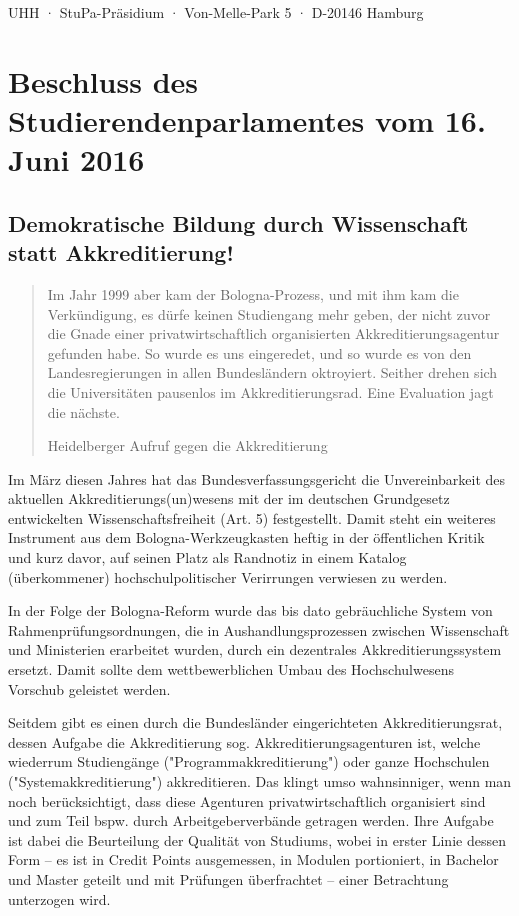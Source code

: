 \documentclass[ngerman,headheight=70pt]{scrartcl}
\begin{document}
    UHH · StuPa-Präsidium · Von-Melle-Park 5 · D-20146 Hamburg

    \section*{Beschluss des Studierendenparlamentes vom 16. Juni 2016}
    \subsection*{Demokratische Bildung durch Wissenschaft statt Akkreditierung!}

    \blockquote[Heidelberger Aufruf gegen die Akkreditierung]{Im Jahr 1999 aber
    kam der Bologna-Prozess, und mit ihm kam die Verkündigung, es dürfe keinen
    Studiengang mehr geben, der nicht zuvor die Gnade einer privatwirtschaftlich
    organisierten Akkreditierungsagentur gefunden habe. So wurde es uns eingeredet,
    und so wurde es von den Landesregierungen in allen Bundesländern oktroyiert.
    Seither drehen sich die Universitäten pausenlos im Akkreditierungsrad. Eine
    Evaluation jagt die nächste.}

    Im März diesen Jahres hat das Bundesverfassungsgericht die Unvereinbarkeit
    des aktuellen Akkreditierungs(un)wesens mit der im deutschen Grundgesetz
    entwickelten Wissenschaftsfreiheit (Art. 5) festgestellt. Damit steht ein
    weiteres Instrument aus dem Bologna-Werkzeugkasten heftig in der öffentlichen
    Kritik und kurz davor, auf seinen Platz als Randnotiz in einem Katalog
    (überkommener) hochschulpolitischer Verirrungen verwiesen zu werden.

    In der Folge der Bologna-Reform wurde das bis dato gebräuchliche System von
    Rahmenprüfungsordnungen, die in Aushandlungsprozessen zwischen Wissenschaft
    und Ministerien erarbeitet wurden, durch ein dezentrales Akkreditierungssystem
    ersetzt. Damit sollte dem wettbewerblichen Umbau des Hochschulwesens Vorschub
    geleistet werden.

    Seitdem gibt es einen durch die Bundesländer eingerichteten Akkreditierungsrat,
    dessen Aufgabe die Akkreditierung sog. Akkreditierungsagenturen ist, welche
    wiederrum Studiengänge ("Programmakkreditierung") oder ganze Hochschulen
    ("Systemakkreditierung") akkreditieren. Das klingt umso wahnsinniger, wenn
    man noch berücksichtigt, dass diese Agenturen privatwirtschaftlich organisiert
    sind und zum Teil bspw. durch Arbeitgeberverbände getragen werden. Ihre Aufgabe
    ist dabei die Beurteilung der Qualität von Studiums, wobei in erster Linie
    dessen Form -- es ist in Credit Points ausgemessen, in Modulen portioniert,
    in Bachelor und Master geteilt und mit Prüfungen überfrachtet -- einer
    Betrachtung unterzogen wird.
\end{document}
